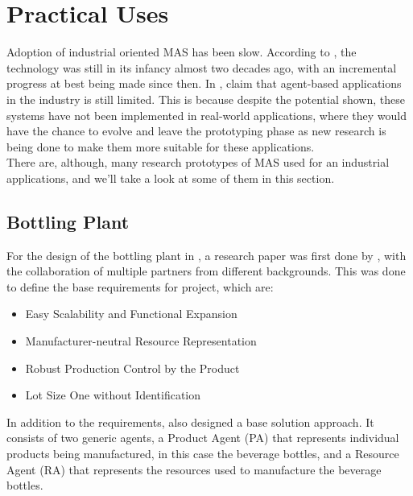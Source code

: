 \section{Practical Uses}

Adoption of industrial oriented MAS has been slow. According to \citeauthor{karnouskos02} \cite{karnouskos02}, the technology was still in its infancy almost two decades ago, with an incremental progress at best being made since then. In \cite{Karnouskos2019}, \citeauthor{Karnouskos2019} claim that agent-based applications in the industry is still limited. This is because despite the potential shown, these systems have not been implemented in real-world applications, where they would have the chance to evolve and leave the prototyping phase as new research is being done to make them more suitable for these applications.\\

There are, although, many research prototypes of MAS used for an industrial applications, and we'll take a look at some of them in this section.

\subsection{Bottling Plant}


For the design of the bottling plant in \cite{bottling_plant_part2}, a research paper \cite{bottling_plant_part1} was first done by \citeauthor{bottling_plant_part2}, with the collaboration of multiple partners from different backgrounds. This was done to define the base requirements for project, which are:

\begin{itemize}
	\item Easy Scalability and Functional Expansion
	\item Manufacturer-neutral Resource Representation
	\item Robust Production Control by the Product
	\item Lot Size One without Identification
\end{itemize}

In addition to the requirements, \citeauthor{bottling_plant_part1} also designed a base solution approach. It consists of two generic agents, a Product Agent (PA) that represents individual products being manufactured, in this case the beverage bottles, and a Resource Agent (RA) that represents the resources used to manufacture the beverage bottles.\\

